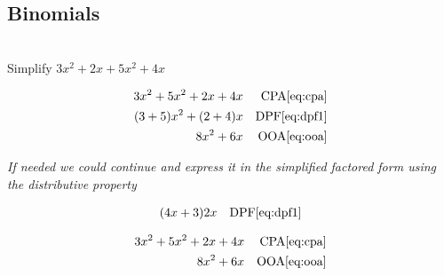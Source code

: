 \subsection*{Binomials}

\begin{example}[id:20141106-152339] \label{20141106-152339}  \hfill \\

Simplify $3x^2+2x+5x^2+4x$

\soln

\solnsteps
\begin{align*}
3x^2+5x^2+2x+4x && \text{CPA} \eqref{eq:cpa} \\
(3+5)x^2+(2+4)x && \text{DPF} \eqref{eq:dpf1} \\ 
8x^2+6x && \text{OOA} \eqref{eq:ooa} 
\end{align*}

\emph{If needed we could continue and express it in the simplified factored form using the distributive property}	

\begin{align*}
(4x+3)2x && \text{DPF} \eqref{eq:dpf1} \\ 
\end{align*}

\soln

\lesssteps
\begin{align*}
3x^2 + 5x^2 + 2x + 4x && \text{CPA} \eqref{eq:cpa} \\
8x^2+6x && \text{OOA} \eqref{eq:ooa} 
\end{align*}
\end{example}

